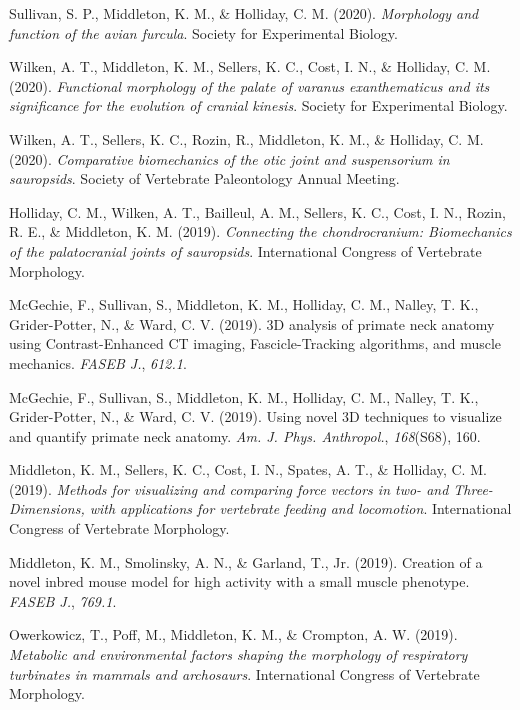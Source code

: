 \documentclass[11pt, a4paper]{awesome-cv}
\begin{document}
\leavevmode\hypertarget{ref-Sullivan2020-df}{}%
Sullivan, S. P., Middleton, K. M., \& Holliday, C. M. (2020).
\emph{Morphology and function of the avian furcula}. Society for
Experimental Biology.

\leavevmode\hypertarget{ref-Wilken2020-ws}{}%
Wilken, A. T., Middleton, K. M., Sellers, K. C., Cost, I. N., \&
Holliday, C. M. (2020). \emph{Functional morphology of the palate of
varanus exanthematicus and its significance for the evolution of cranial
kinesis}. Society for Experimental Biology.

\leavevmode\hypertarget{ref-Wilken2020-ks}{}%
Wilken, A. T., Sellers, K. C., Rozin, R., Middleton, K. M., \& Holliday,
C. M. (2020). \emph{Comparative biomechanics of the otic joint and
suspensorium in sauropsids}. Society of Vertebrate Paleontology Annual
Meeting.

\leavevmode\hypertarget{ref-Holliday2019-tp}{}%
Holliday, C. M., Wilken, A. T., Bailleul, A. M., Sellers, K. C., Cost,
I. N., Rozin, R. E., \& Middleton, K. M. (2019). \emph{Connecting the
chondrocranium: Biomechanics of the palatocranial joints of sauropsids}.
International Congress of Vertebrate Morphology.

\leavevmode\hypertarget{ref-McGechie2019-xy}{}%
McGechie, F., Sullivan, S., Middleton, K. M., Holliday, C. M., Nalley,
T. K., Grider-Potter, N., \& Ward, C. V. (2019). 3D analysis of primate
neck anatomy using Contrast-Enhanced CT imaging, Fascicle-Tracking
algorithms, and muscle mechanics. \emph{FASEB J.}, \emph{612.1}.

\leavevmode\hypertarget{ref-McGechie2019-ov}{}%
McGechie, F., Sullivan, S., Middleton, K. M., Holliday, C. M., Nalley,
T. K., Grider-Potter, N., \& Ward, C. V. (2019). Using novel 3D
techniques to visualize and quantify primate neck anatomy. \emph{Am. J.
Phys. Anthropol.}, \emph{168}(S68), 160.

\leavevmode\hypertarget{ref-Middleton2019-ll}{}%
Middleton, K. M., Sellers, K. C., Cost, I. N., Spates, A. T., \&
Holliday, C. M. (2019). \emph{Methods for visualizing and comparing
force vectors in two- and Three-Dimensions, with applications for
vertebrate feeding and locomotion}. International Congress of Vertebrate
Morphology.

\leavevmode\hypertarget{ref-Middleton2019-si}{}%
Middleton, K. M., Smolinsky, A. N., \& Garland, T., Jr. (2019). Creation
of a novel inbred mouse model for high activity with a small muscle
phenotype. \emph{FASEB J.}, \emph{769.1}.

\leavevmode\hypertarget{ref-Owerkowicz2019-hc}{}%
Owerkowicz, T., Poff, M., Middleton, K. M., \& Crompton, A. W. (2019).
\emph{Metabolic and environmental factors shaping the morphology of
respiratory turbinates in mammals and archosaurs}. International
Congress of Vertebrate Morphology.
\end{document}
